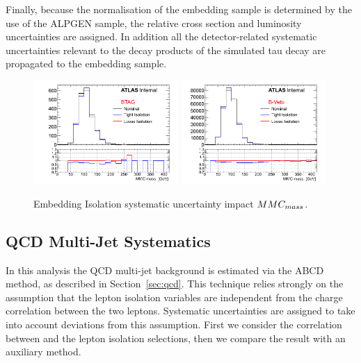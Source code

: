 Finally, because the normalisation of the embedding sample is determined by the use of the ALPGEN sample, 
the relative cross section and luminosity uncertainties are assigned. In addition
all the detector-related systematic uncertainties relevant to the decay products of the simulated tau 
decay are propagated to the embedding sample.
 
\begin{figure}[tp]
	\begin{center}
	\includegraphics[width=0.49\textwidth]{figure/systematics/emb_sys_BtagFull_Iso.png}
	\includegraphics[width=0.49\textwidth]{figure/systematics/emb_sys_NoBtagFull_Iso.png}
	\end{center}
	\caption{Embedding Isolation systematic uncertainty impact $MMC_{mass}$.}
	\label{fig:EMBISO}
\end{figure}

\subsection{QCD Multi-Jet Systematics}

In this analysis the QCD multi-jet background is estimated via the ABCD method, as
described in Section~\ref{sec:qcd}. This technique relies strongly on
the assumption that the lepton isolation variables are independent from the
charge correlation between the two leptons. Systematic uncertainties
are assigned to take into account deviations from this assumption.
First we consider the correlation between \rqcd and the lepton isolation selections,
then we compare the result with an auxiliary method. 

